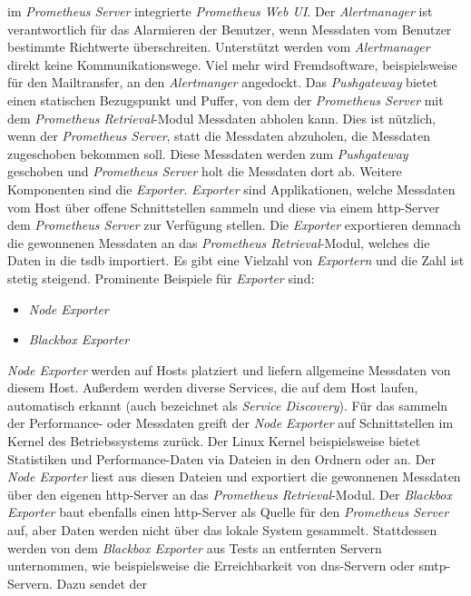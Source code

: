 \documentclass[titlepage]{report}
\begin{document}
im \emph{Prometheus Server} integrierte \emph{Prometheus Web UI}. Der
\emph{Alertmanager} ist verantwortlich für das Alarmieren der Benutzer,
wenn Messdaten vom Benutzer bestimmte Richtwerte überschreiten.
Unterstützt werden vom \emph{Alertmanager} direkt keine
Kommunikationswege. Viel mehr wird Fremdsoftware, beispielsweise für den
Mailtransfer, an den \emph{Alertmanger} angedockt. Das
\emph{Pushgateway} bietet einen statischen Bezugspunkt und Puffer, von dem der
\emph{Prometheus Server} mit dem \emph{Prometheus Retrieval}\hyp{}Modul Messdaten
abholen kann. Dies ist nützlich, wenn der \emph{Prometheus Server}, statt
die Messdaten abzuholen, die Messdaten zugeschoben bekommen soll. Diese Messdaten
werden zum \emph{Pushgateway} geschoben und \emph{Prometheus
Server} holt die Messdaten dort ab. Weitere Komponenten sind die
\emph{Exporter}. \emph{Exporter} sind Applikationen, welche
Messdaten vom Host über offene Schnittstellen sammeln und diese via einem
\gls{http}\hyp{}Server dem \emph{Prometheus Server} zur Verfügung
stellen. Die \emph{Exporter} exportieren demnach die gewonnenen Messdaten an das
\emph{Prometheus Retrieval}\hyp{}Modul, welches die Daten in die
\gls{tsdb} importiert. Es gibt eine Vielzahl von
\emph{Exportern} und die Zahl ist stetig steigend. Prominente Beispiele
für \emph{Exporter} sind:
\begin{itemize}
    \item \emph{Node Exporter}
    \item \emph{Blackbox Exporter}
\end{itemize}
\emph{Node Exporter} werden auf Hosts platziert und liefern allgemeine
Messdaten von diesem Host. Außerdem werden diverse Services, die auf dem
Host laufen, automatisch erkannt (auch bezeichnet als \emph{Service
Discovery}). Für das sammeln der Performance\hyp{} oder Messdaten greift
der \emph{Node Exporter} auf Schnittstellen im Kernel des
Betriebssystems zurück. Der Linux Kernel beispielsweise bietet
Statistiken und Performance\hyp{}Daten via Dateien in den Ordnern
 oder  an. Der \emph{Node Exporter} liest
aus diesen Dateien und exportiert die gewonnenen Messdaten über den
eigenen \gls{http}\hyp{}Server an das \emph{Prometheus
Retrieval}\hyp{}Modul. Der \emph{Blackbox Exporter} baut ebenfalls einen
\gls{http}\hyp{}Server als Quelle für den \emph{Prometheus Server} auf,
aber Daten werden nicht über das lokale System  gesammelt. Stattdessen
werden von dem \emph{Blackbox Exporter} aus Tests an entfernten Servern
unternommen, wie beispielsweise die Erreichbarkeit von
\gls{dns}\hyp{}Servern oder \gls{smtp}\hyp{}Servern. Dazu sendet der
\end{document}
